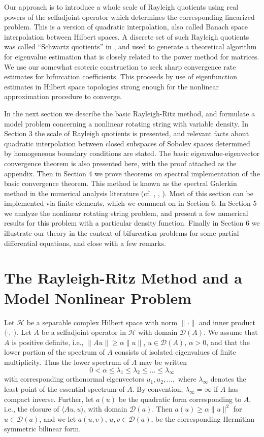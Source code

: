 \documentclass[final]{siamltex}
\numberwithin{equation}{section}
\begin{document}
Our approach is to introduce a whole scale of Rayleigh quotients using real powers of the selfadjoint operator which determines the corresponding linearized problem. This is a version of quadratic interpolation, also called Banach space interpolation between Hilbert spaces. A discrete set of such Rayleigh quotients was called ``Schwartz quotients'' in \cite{Collatz}, and used to generate a theoretical algorithm for eigenvalue estimation that is closely related to the power method for matrices.  We use our somewhat esoteric construction to seek sharp convergence rate estimates for bifurcation coefficients. This proceeds by use of eigenfunction estimates in Hilbert space topologies strong enough for the nonlinear approximation procedure to converge.

In the next section we describe the basic Rayleigh-Ritz method, and formulate a model problem concerning a nonlinear rotating string with variable density. In Section 3 the scale of Rayleigh quotients is presented, and relevant facts about quadratic interpolation between closed subspaces of Sobolev spaces determined by homogeneous boundary conditions are stated. The basic eigenvalue-eigenvector convergence theorem is also presented here, with the proof attached as the appendix. Then in Section 4 we prove theorems on spectral implementation of the basic convergence theorem. This method is known as the spectral Galerkin method in the numerical analysis literature (cf. \cite{Bernardi-Maday}, \cite{Boyd}, \cite{Mercier}). Most of this section can be implemented via finite elements, which we comment on in Section 6. In Section 5 we analyze the nonlinear rotating string problem, and present a few numerical results for this problem with a particular density function. Finally in Section 6 we illustrate our theory in the context of bifurcation problems for some partial differential equations, and close with a few remarks.

\section{The Rayleigh-Ritz Method and a Model Nonlinear Problem} \label{rrm}

Let $\mathcal{H}$ be a separable complex Hilbert space with norm
$\| \cdot \|$ and inner product $\langle \cdot, \cdot \rangle$.
Let $A$ be a selfadjoint operator in  $\mathcal{H}$ with domain
$\mathcal{D}(A)$. We assume that $A$ is positive definite, i.e.,
$\|A u \| \ge \alpha \|u\|$, $u \in \mathcal{D}(A)$, $\alpha >0$,
and that the lower portion of the spectrum of $A$ consists of
isolated eigenvalues of finite multiplicity. Thus the lower
spectrum of $A$ may be written
\[0<\alpha \le {\lambda}_1 \le {\lambda}_2 \le \ldots \le {\lambda}_{\infty}\]
with corresponding orthonormal eigenvectors $u_1, u_2, \ldots,$
where ${\lambda}_{\infty}$ denotes the least point of the essential
spectrum of $A$. By convention, ${\lambda}_{\infty} = \infty$ if $A$ has
compact inverse. Further, let $a(u)$ be the quadratic form
corresponding to $A$, i.e., the closure of $\langle A u , u
\rangle$, with domain $\mathcal{D}(a)$. Then $a(u) \ge \alpha \|u
\|^2$ for $u \in \mathcal{D}(a)$, and we let $a(u,v)$, $u, v \in
\mathcal{D}(a)$, be the corresponding Hermitian symmetric bilinear
form.
\end{document}
